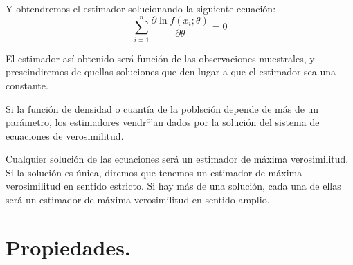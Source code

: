 Y obtendremos el estimador solucionando la siguiente ecuaci\'on:
\begin{equation*}
\sum_{i=1}^n\dfrac{\partial\ln{f(x_i;\theta)}}{\partial\theta}=0
\end{equation*}

El estimador as\'i obtenido ser\'a funci\'on de las observaciones muestrales, y prescindiremos de quellas soluciones que den lugar a que el estimador sea una constante.

Si la funci\'on de densidad o cuant\'ia de la poblsci\'on depende de m\'as de un par\'ametro, los estimadores vendrº'an dados por la soluci\'on del sistema de ecuaciones de verosimilitud.

Cualquier soluci\'on de las ecuaciones ser\'a un estimador de m\'axima verosimilitud. Si la soluci\'on es \'unica, diremos que tenemos un estimador de m\'axima verosimilitud en sentido estricto. Si hay m\'as de una soluci\'on, cada una de ellas ser\'a un estimador de m\'axima verosimilitud en sentido amplio.

\section{Propiedades.}

